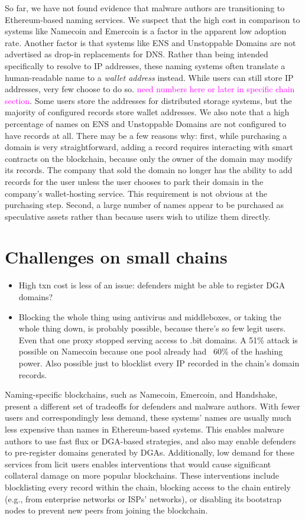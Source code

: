 \documentclass[10pt,sigconf,letterpaper]{acmart}
\newcommand{\randall}{\ding{110}\ding{43}\textcolor{magenta}}
\newcommand{\randall}{}
\begin{document}
So far, we have not found evidence that malware authors are 
transitioning to Ethereum-based naming services. We suspect that the high cost in 
comparison to systems like Namecoin and Emercoin is a factor in the apparent low adoption rate. 
Another factor is that systems like ENS and Unstoppable Domains are not advertised as drop-in 
replacements for DNS. Rather than being intended specifically to resolve to IP addresses, these 
naming systems often translate a human-readable name to a \emph{wallet address} instead. While 
users can still store IP addresses, very few choose to do so. \randall{need numbers here or later 
in specific chain section}. Some users store the addresses for distributed storage systems, but the 
majority of configured records store wallet addresses. We also note that a high percentage of names 
on ENS and Unstoppable Domains are not configured to have records at all. There may be a few 
reasons why: first, while purchasing a domain is very straightforward, adding a record requires 
interacting with smart contracts on the blockchain, because only the owner of the domain may modify 
its records. The company that sold the domain no longer has the ability to add records for the user 
unless the user chooses to park their domain in the company's wallet-hosting service. This 
requirement is not obvious at the purchasing step. Second, a large number of names appear to be 
purchased as speculative assets rather than because users wish to utilize them directly. 

\section{Challenges on small chains}
\begin{itemize}
	\item High txn cost is less of an issue: defenders might 
	be able to register DGA domains? 
	\item Blocking the whole thing using antivirus and 
	middleboxes, or taking the whole thing down, is probably 
	possible, because there's so few legit users. Even that 
	one proxy stopped serving access to .bit domains. A 51\% 
	attack is possible on Namecoin because one pool already 
	had ~60\% of the hashing power. Also possible just to 
	blocklist every IP recorded in the chain's domain records.
\end{itemize}

Naming-specific blockchains, such as Namecoin, Emercoin, and Handshake, present 
a different set of tradeoffs for defenders and malware authors. With fewer 
users and correspondingly less demand, these systems' names are usually much 
less expensive than names in Ethereum-based systems. This enables malware 
authors to use fast flux or DGA-based strategies, and also may enable defenders 
to pre-register domains generated by DGAs. Additionally, low demand for these 
services from licit users enables interventions that would cause significant 
collateral damage on more popular blockchains. These interventions include 
blocklisting every record within the chain, blocking access to the chain 
entirely (e.g., from enterprise networks or ISPs' networks), or disabling its 
bootstrap nodes to prevent new peers from joining the blockchain.
\end{document}
